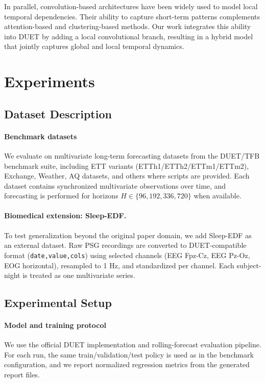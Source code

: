 \documentclass[conference]{IEEEtran}
\begin{document}
In parallel, convolution-based architectures have been widely used to model local temporal dependencies. Their ability to capture short-term patterns complements attention-based and clustering-based methods. Our work integrates this ability into DUET by adding a local convolutional branch, resulting in a hybrid model that jointly captures global and local temporal dynamics.

\section{Experiments}
\subsection{Dataset Description}

\paragraph{Benchmark datasets}
We evaluate on multivariate long-term forecasting datasets from the DUET/TFB benchmark suite, including ETT variants (ETTh1/ETTh2/ETTm1/ETTm2), Exchange, Weather, AQ datasets, and others where scripts are provided.  
Each dataset contains synchronized multivariate observations over time, and forecasting is performed for horizons $H\in\{96,192,336,720\}$ when available.

\paragraph{Biomedical extension: Sleep-EDF.}
To test generalization beyond the original paper domain, we add Sleep-EDF \cite{sleep} as an external dataset.  
Raw PSG recordings are converted to DUET-compatible format (\texttt{date,value,cols}) using selected channels (EEG Fpz-Cz, EEG Pz-Oz, EOG horizontal), resampled to 1 Hz, and standardized per channel.  
Each subject-night is treated as one multivariate series.
\subsection{Experimental Setup}

\paragraph{Model and training protocol}
We use the official DUET implementation and rolling-forecast evaluation pipeline. For each run, the same train/validation/test policy is used as in the benchmark configuration, and we report normalized regression metrics from the generated report files.
\end{document}
